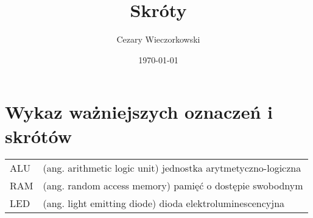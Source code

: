 \documentclass[./main.tex]{subfiles}
\author{Cezary Wieczorkowski}
\date{\today}
\title{Skróty}
\begin{document}
\section*{Wykaz ważniejszych oznaczeń i skrótów}

\begin{tabular}{l p{}}
ALU & (ang. arithmetic logic unit) jednostka arytmetyczno-logiczna\\[0pt]
RAM & (ang. random access memory) pamięć o dostępie swobodnym\\[0pt]
LED & (ang. light emitting diode) dioda elektroluminescencyjna\\[0pt]
\end{tabular}
\end{document}
